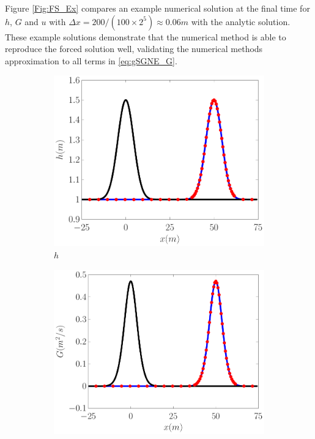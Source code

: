 \documentclass[10pt]{elsarticle}
\begin{document}
Figure \ref{Fig:FS_Ex} compares an example numerical solution at the final time for $h$, $G$ and $u$ with $\Delta x = 200 / (100 \times 2^{5}) \approx 0.06m$ with the analytic solution. These example solutions demonstrate that the numerical method is able to reproduce the forced solution well, validating the numerical methods approximation to all terms in \eqref{eq:gSGNE_G}. 
%
\begin{figure}
	\centering
	\begin{subfigure}{0.32\textwidth}
		\centering
		\includegraphics[width=\textwidth]{./Figures/Simulations/Validation/Forced/iSGN/h.pdf}
		\caption{$h$}
	\end{subfigure}
	\begin{subfigure}{0.32\textwidth}
		\centering
		\includegraphics[width=\textwidth]{./Figures/Simulations/Validation/Forced/iSGN//G.pdf}

\end{subfigure}
\end{figure}
\end{document}
